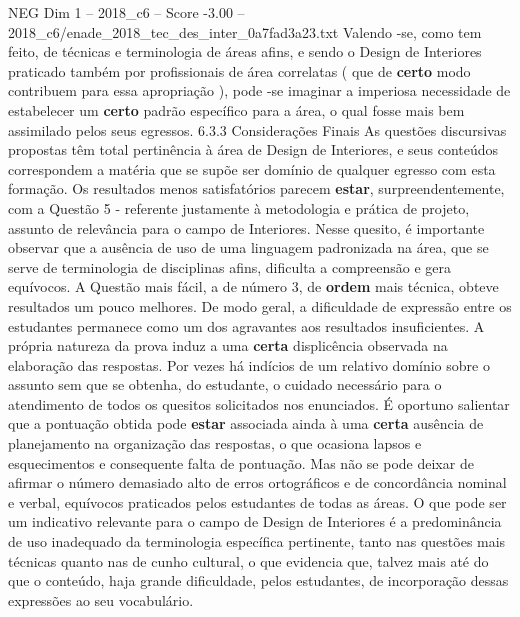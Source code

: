 \begin{textsample}{NEG Dim 1 – 2018\_c6 – Score -3.00 – 2018\_c6/enade\_2018\_tec\_des\_inter\_0a7fad3a23.txt}
Valendo -se, como tem feito, de técnicas e terminologia de áreas afins, e sendo o Design de Interiores praticado também por profissionais de área correlatas ( que de \textbf{certo} modo contribuem para essa apropriação ), pode -se imaginar a imperiosa necessidade de estabelecer um \textbf{certo} padrão específico para a área, o qual fosse mais bem assimilado pelos seus egressos. 6.3.3 Considerações Finais As questões discursivas propostas têm total pertinência à área de Design de Interiores, e seus conteúdos correspondem a matéria que se supõe ser domínio de qualquer egresso com esta formação.
Os resultados menos satisfatórios parecem \textbf{estar}, surpreendentemente, com a Questão 5 - referente justamente à metodologia e prática de projeto, assunto de relevância para o campo de Interiores.
Nesse quesito, é importante observar que a ausência de uso de uma linguagem padronizada na área, que se serve de terminologia de disciplinas afins, dificulta a compreensão e gera equívocos.
A Questão mais fácil, a de número 3, de \textbf{ordem} mais técnica, obteve resultados um pouco melhores.
De modo geral, a dificuldade de expressão entre os estudantes permanece como um dos agravantes aos resultados insuficientes.
A própria natureza da prova induz a uma \textbf{certa} displicência observada na elaboração das respostas.
Por vezes há indícios de um relativo domínio sobre o assunto sem que se obtenha, do estudante, o cuidado necessário para o atendimento de todos os quesitos solicitados nos enunciados.
É oportuno salientar que a pontuação obtida pode \textbf{estar} associada ainda à uma \textbf{certa} ausência de planejamento na organização das respostas, o que ocasiona lapsos e esquecimentos e consequente falta de pontuação.
Mas não se pode deixar de afirmar o número demasiado alto de erros ortográficos e de concordância nominal e verbal, equívocos praticados pelos estudantes de todas as áreas.
O que pode ser um indicativo relevante para o campo de Design de Interiores é a predominância de uso inadequado da terminologia específica pertinente, tanto nas questões mais técnicas quanto nas de cunho cultural, o que evidencia que, talvez mais até do que o conteúdo, haja grande dificuldade, pelos estudantes, de incorporação dessas expressões ao seu vocabulário.

\end{textsample}
